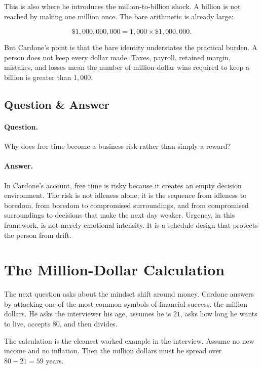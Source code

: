 This is also where he introduces the million-to-billion shock. A billion is not reached by making one million once. The bare arithmetic is already large:

\begin{equation}
\$1{,}000{,}000{,}000=1{,}000\times \$1{,}000{,}000.
\end{equation}

But Cardone's point is that the bare identity understates the practical burden. A person does not keep every dollar made. Taxes, payroll, retained margin, mistakes, and losses mean the number of million-dollar wins required to keep a billion is greater than \(1{,}000\).

\subsection{Question \& Answer}

\paragraph{Question.} Why does free time become a business risk rather than simply a reward?

\paragraph{Answer.} In Cardone's account, free time is risky because it creates an empty decision environment. The risk is not idleness alone; it is the sequence from idleness to boredom, from boredom to compromised surroundings, and from compromised surroundings to decisions that make the next day weaker. Urgency, in this framework, is not merely emotional intensity. It is a schedule design that protects the person from drift.

\section{The Million-Dollar Calculation}

The next question asks about the mindset shift around money. Cardone answers by attacking one of the most common symbols of financial success: the million dollars. He asks the interviewer his age, assumes he is \(21\), asks how long he wants to live, accepts \(80\), and then divides.

The calculation is the cleanest worked example in the interview. Assume no new income and no inflation. Then the million dollars must be spread over \(80-21=59\) years.

